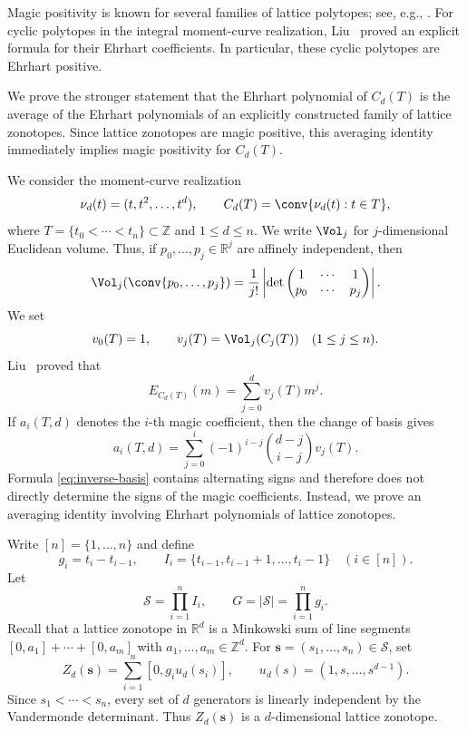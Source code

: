 \documentclass[a4paper,reqno,11pt,oneside]{amsart}
\newcommand{\Sc}{\mathcal{S}}
\newcommand{\ZZ}{\mathbb{Z}}
\newcommand{\RR}{\mathbb{R}}
\theoremstyle{definition}
\theoremstyle{remark}
\begin{document}
Magic positivity is known for several families of lattice polytopes; see, e.g., \cite{athanasiadis2026lattice,avila2026luck,beck2019h,ferroni2024examples,hill2026lattice,konoike2024new,konoike2025magic,liu2026magic}. For cyclic polytopes in the integral moment-curve realization, Liu~\cite{liu2005ehrhart} proved an explicit formula for their Ehrhart coefficients. In particular, these cyclic polytopes are Ehrhart positive.

We prove the stronger statement that the Ehrhart polynomial of $C_d(T)$ is the average of the Ehrhart polynomials of an explicitly constructed family of lattice zonotopes. Since lattice zonotopes are magic positive, this averaging identity immediately implies magic positivity for $C_d(T)$.

We consider the moment-curve realization
\[
\nu_d(t)=(t,t^2,\ldots,t^d),\qquad C_d(T)=\conv\{\nu_d(t):t\in T\},
\]
where $T=\{t_0<\cdots<t_n\}\subset\ZZ$ and $1\le d\le n$. We write $\Vol_j$ for $j$-dimensional Euclidean volume. Thus, if $p_0,\ldots,p_j\in\RR^j$ are affinely independent, then
\[
\Vol_j(\conv\{p_0,\ldots,p_j\}) =\frac{1}{j!}\left|\det
    \begin{pmatrix}
    1&\cdots&1\\
    p_0&\cdots&p_j
    \end{pmatrix}
    \right|.
\]
We set
\[
v_0(T)=1,\qquad v_j(T)=\Vol_j(C_j(T))\quad(1\le j\le n).
\]
Liu~\cite[Theorem~1.2]{liu2005ehrhart} proved that 
\begin{equation}\label{eq:liu}
    E_{C_d(T)}(m)=\sum_{j=0}^d v_j(T)m^j.
\end{equation}
If $a_i(T,d)$ denotes the $i$-th magic coefficient, then the change of basis gives
\begin{equation}\label{eq:inverse-basis}
    a_i(T,d)=\sum_{j=0}^i(-1)^{i-j}\binom{d-j}{i-j}v_j(T).
\end{equation}
Formula \eqref{eq:inverse-basis} contains alternating signs and therefore does not directly determine the signs of the magic coefficients. Instead, we prove an averaging identity involving Ehrhart polynomials of lattice zonotopes.

Write $[n]=\{1,\ldots,n\}$ and define
\[
g_i=t_i-t_{i-1},\qquad I_i=\{t_{i-1},t_{i-1}+1,\ldots,t_i-1\}\quad(i\in[n]).
\]
Let
\[
\Sc=\prod_{i=1}^n I_i, \qquad G=|\Sc|=\prod_{i=1}^n g_i.
\]
Recall that a lattice zonotope in $\RR^d$ is a Minkowski sum of line segments $[0,a_1]+\cdots+[0,a_m]$ with $a_1,\ldots,a_m\in\ZZ^d$. For $\mathbf s=(s_1,\ldots,s_n)\in\Sc$, set 
\begin{equation}\label{eq:zonotope}
    Z_d(\mathbf s)=\sum_{i=1}^n[0,g_i u_d(s_i)],\qquad u_d(s)=(1,s,\ldots,s^{d-1}).
\end{equation}
Since $s_1<\cdots<s_n$, every set of $d$ generators is linearly independent by the Vandermonde determinant. Thus $Z_d(\mathbf s)$ is a $d$-dimensional lattice zonotope.
\end{document}
